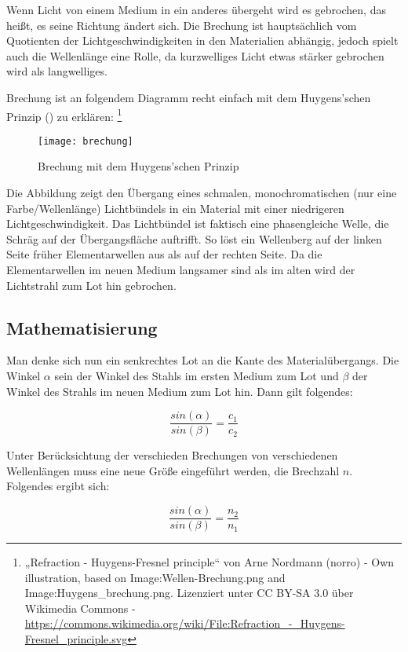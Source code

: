 Wenn Licht von einem Medium in ein anderes übergeht wird es gebrochen, das heißt, es seine Richtung ändert sich. Die Brechung ist hauptsächlich vom Quotienten der Lichtgeschwindigkeiten in den Materialien abhängig, jedoch spielt auch die Wellenlänge eine Rolle, da kurzwelliges Licht etwas stärker gebrochen wird als langwelliges.

Brechung ist an folgendem Diagramm recht einfach mit dem Huygens'schen Prinzip () zu erklären: \footnote{„Refraction - Huygens-Fresnel principle“ von Arne Nordmann (norro) - Own illustration, based on Image:Wellen-Brechung.png and Image:Huygens\_brechung.png. Lizenziert unter CC BY-SA 3.0 über Wikimedia Commons - \url{https://commons.wikimedia.org/wiki/File:Refraction\_-\_Huygens-Fresnel\_principle.svg}}

\begin{figure}[h!]
	\center
	\texttt{[image: brechung]}
	\caption{Brechung mit dem Huygens'schen Prinzip}
\end{figure}

Die Abbildung zeigt den Übergang eines schmalen, monochromatischen (nur eine Farbe/Wellenlänge) Lichtbündels in ein Material mit einer niedrigeren Lichtgeschwindigkeit. Das Lichtbündel ist faktisch eine phasengleiche Welle, die Schräg auf der Übergangsfläche auftrifft. So löst ein Wellenberg auf der linken Seite früher Elementarwellen aus als auf der rechten Seite. Da die Elementarwellen im neuen Medium langsamer sind als im alten wird der Lichtstrahl zum Lot hin gebrochen.

\subsection{Mathematisierung}

	Man denke sich nun ein senkrechtes Lot an die Kante des Materialübergangs. Die Winkel $\alpha$ sein der Winkel des Stahls im ersten Medium zum Lot und $\beta$ der Winkel des Strahls im neuen Medium zum Lot hin. Dann gilt folgendes:
	
	\begin{equation}
		\frac{sin{(\alpha)}}{sin{(\beta)}} = \frac{c_1}{c_2}
	\end{equation}
	
	Unter Berücksichtung der verschieden Brechungen von verschiedenen Wellenlängen muss eine neue Größe eingeführt werden, die Brechzahl $n$. Folgendes ergibt sich:
	
	\begin{equation} \label{eq:brechungsgesetz}
		\frac{sin{(\alpha)}}{sin{(\beta)}} = \frac{n_2}{n_1}
	\end{equation}